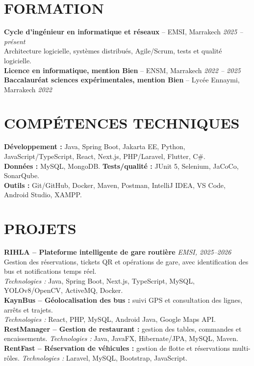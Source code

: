 \documentclass[a4paper,11pt]{article}
\begin{document}
\section{FORMATION}
\textbf{Cycle d'ingénieur en informatique et réseaux} -- EMSI, Marrakech \hfill \textit{2025 -- présent}\\[-0.05em]
Architecture logicielle, systèmes distribués, Agile/Scrum, tests et qualité logicielle.\\[-0.05em]
\textbf{Licence en informatique, mention Bien} -- ENSM, Marrakech \hfill \textit{2022 -- 2025}\\[-0.05em]
\textbf{Baccalauréat sciences expérimentales, mention Bien} -- Lycée Ennaymi, Marrakech \hfill \textit{2022}

\section{COMPÉTENCES TECHNIQUES}
\textbf{Développement :} Java, Spring Boot, Jakarta EE, Python, JavaScript/TypeScript, React, Next.js, PHP/Laravel, Flutter, C\#.\\[-0.05em]
\textbf{Données :} MySQL, MongoDB. \textbf{Tests/qualité :} JUnit 5, Selenium, JaCoCo, SonarQube.\\[-0.05em]
\textbf{Outils :} Git/GitHub, Docker, Maven, Postman, IntelliJ IDEA, VS Code, Android Studio, XAMPP.

\section{PROJETS}
\textbf{RIHLA -- Plateforme intelligente de gare routière} \hfill \textit{EMSI, 2025--2026}\\[-0.05em]
Gestion des réservations, tickets QR et opérations de gare, avec identification des bus et notifications temps réel.\\[-0.05em]
\textit{Technologies :} Java, Spring Boot, Next.js, TypeScript, MySQL, YOLOv8/OpenCV, ActiveMQ, Docker.\\[-0.05em]
\textbf{KaynBus -- Géolocalisation des bus :} suivi GPS et consultation des lignes, arrêts et trajets.\\[-0.05em]
\textit{Technologies :} React, PHP, MySQL, Android Java, Google Maps API.\\[-0.05em]
\textbf{RestManager -- Gestion de restaurant :} gestion des tables, commandes et encaissements. \textit{Technologies :} Java, JavaFX, Hibernate/JPA, MySQL, Maven.\\[-0.05em]
\textbf{RentFast -- Réservation de véhicules :} gestion de flotte et réservations multi-rôles. \textit{Technologies :} Laravel, MySQL, Bootstrap, JavaScript.
\end{document}
